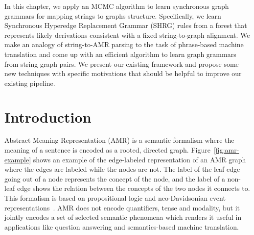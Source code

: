 In this chapter, we apply an MCMC algorithm to learn synchronous graph grammars for mapping strings
to graphs structure. Specifically, we learn Synchronous Hyperedge Replacement Grammar (SHRG) rules from a forest that represents likely derivations consistent with a fixed string-to-graph 
alignment. We make an analogy of string-to-AMR parsing to the task of phrase-based machine translation and
come up with an efficient algorithm to learn graph grammars from string-graph pairs. We present our existing framework and propose some new techniques with specific motivations that should 
be helpful to improve our existing pipeline.
\section{Introduction} 
Abstract Meaning Representation (AMR) \cite{banarescu2013abstract} is a semantic formalism where the meaning 
of a sentence is encoded as a rooted, directed graph. 
Figure~\ref{fig:amr-example} shows an example of the edge-labeled representation of an AMR 
graph where the edges are labeled while the nodes are not. The label of the leaf edge going out of a node represents 
the concept of the node, and the label of a non-leaf edge shows the relation between the concepts of the two nodes it connects to. 
This formalism is based on propositional logic and neo-Davidsonian event representations~\cite{parsons1990events,Davidson:1967}.
AMR does not encode quantifiers, tense and modality, but it jointly encodes a set of selected semantic phenomena which renders
it useful in applications like question answering and semantics-based machine translation.

